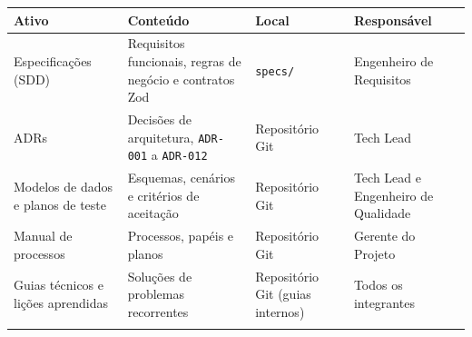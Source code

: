 {\footnotesize
\begin{tabularx}{\textwidth}{>{\hsize=0.888\hsize\sloppy\arraybackslash}X >{\hsize=1.600\hsize\sloppy\arraybackslash}X >{\hsize=0.664\hsize\sloppy\arraybackslash}X >{\hsize=0.848\hsize\sloppy\arraybackslash}X}
\arrayrulecolor{GithubTableBorder}\toprule
\rowcolor{BrandTableHeader}
\textbf{Ativo} & \textbf{Conteúdo} & \textbf{Local} & \textbf{Responsável} \\
\midrule
\arrayrulecolor{BrandGrayRule}
Especificações (SDD) & Requisitos funcionais, regras de negócio e contratos Zod & \texttt{specs/} & Engenheiro de Requisitos \\
\midrule
ADRs & Decisões de arquitetura, \texttt{ADR-001} a \texttt{ADR-012} & Repositório Git & Tech Lead \\
\midrule
Modelos de dados e planos de teste & Esquemas, cenários e critérios de aceitação & Repositório Git & Tech Lead e Engenheiro de Qualidade \\
\midrule
Manual de processos & Processos, papéis e planos & Repositório Git & Gerente do Projeto \\
\midrule
Guias técnicos e lições aprendidas & Soluções de problemas recorrentes & Repositório Git (guias internos) & Todos os integrantes \\
\arrayrulecolor{GithubTableBorder}\bottomrule
\end{tabularx}%
}
